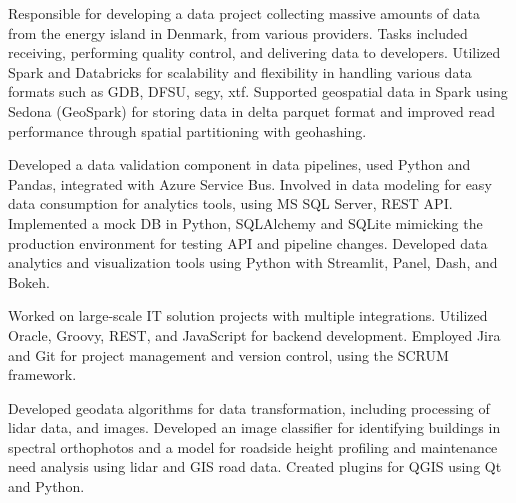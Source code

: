 Responsible for developing a data project collecting massive amounts of data from the energy island in Denmark, from various providers.
 Tasks included receiving, performing quality control, and delivering data to developers.
 Utilized Spark and Databricks for scalability and flexibility in handling various data formats such as GDB, DFSU, segy, xtf.
 Supported geospatial data in Spark using Sedona (GeoSpark) for storing data in delta parquet format and improved read performance through spatial partitioning with geohashing.

       
\divider

Developed a data validation component in data pipelines, used Python and Pandas, integrated with Azure Service Bus.
 Involved in data modeling for easy data consumption for analytics tools, using MS SQL Server, REST API.
 Implemented a mock DB in Python, SQLAlchemy and SQLite mimicking the production environment for testing API and pipeline changes.
 Developed data analytics and visualization tools using Python with Streamlit, Panel, Dash, and Bokeh.

              
\divider

Worked on large-scale IT solution projects with multiple integrations.
 Utilized Oracle, Groovy, REST, and JavaScript for backend development.
 Employed Jira and Git for project management and version control, using the SCRUM framework.

      
\divider

Developed geodata algorithms for data transformation, including processing of lidar data, and images.
 Developed an image classifier for identifying buildings in spectral orthophotos and a model for roadside height profiling and maintenance need analysis using lidar and GIS road data.
 Created plugins for QGIS using Qt and Python.

